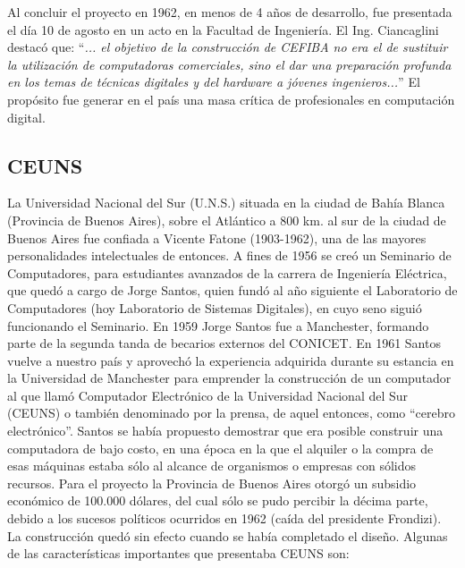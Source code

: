 \documentclass[%
 	final,
%
	notitlepage,
	narroweqnarray,
	inline,
 	twoside,
	]{ieee}
\begin{document}
Al concluir el proyecto en 1962, en menos de 4 a\~nos de desarrollo, fue presentada el d\'ia 10 de agosto en un acto en la Facultad de Ingenier\'ia. El Ing. Ciancaglini destac\'o que: ``\textit{... el objetivo de la construcci\'on de CEFIBA no era el de sustituir la utilizaci\'on de computadoras comerciales, sino el dar una preparaci\'on profunda en los temas de t\'ecnicas digitales y del hardware a j\'ovenes ingenieros...}'' El prop\'osito fue generar en el pa\'is una masa cr\'itica de profesionales en computaci\'on digital.


\subsection*{CEUNS}
La Universidad Nacional del Sur (U.N.S.) situada en la ciudad de Bah\'ia Blanca (Provincia de Buenos Aires), sobre el Atl\'antico a 800 km. al sur de la ciudad de Buenos Aires fue confiada a Vicente Fatone (1903-1962), una de las mayores personalidades intelectuales de entonces. A fines de 1956 se cre\'o un Seminario de Computadores, para estudiantes avanzados de la carrera de Ingenier\'ia El\'ectrica, que qued\'o a cargo de Jorge Santos, quien fund\'o al a\~no siguiente el Laboratorio de Computadores (hoy Laboratorio de Sistemas Digitales), en cuyo seno sigui\'o funcionando el Seminario.
En 1959 Jorge Santos fue a Manchester, formando parte de la segunda tanda de becarios externos del CONICET. En 1961 Santos vuelve a nuestro pa\'is y aprovech\'o la experiencia adquirida durante su estancia en la Universidad de Manchester para emprender la construcci\'on de un computador al que llam\'o Computador Electr\'onico de la Universidad Nacional del Sur (CEUNS) o tambi\'en denominado por la prensa, de aquel entonces, como ``cerebro electr\'onico''. Santos se hab\'ia propuesto demostrar que era posible construir una  computadora de bajo costo, en una \'epoca en la que el alquiler o la compra de esas m\'aquinas estaba s\'olo al alcance de organismos o empresas con s\'olidos recursos. Para el proyecto la Provincia de Buenos Aires otorg\'o un subsidio econ\'omico de  100.000 d\'olares, del cual s\'olo se pudo percibir la d\'ecima parte, debido a los sucesos pol\'iticos ocurridos en 1962 (ca\'ida del presidente Frondizi). La construcci\'on qued\'o sin efecto cuando se hab\'ia completado el dise\~no.
Algunas de las caracter\'isticas importantes que presentaba CEUNS son:
\end{document}
